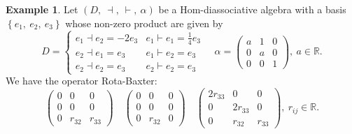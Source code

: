 \documentclass[11pt,twoside,reqno]{amsart}
\theoremstyle{plain}
\theoremstyle{definition}
\newtheorem{ex}[thm]{Example}
\begin{document}
\begin{ex}
Let $(D ,\ \dashv,\  \vdash,\  \alpha)$ be a Hom-diassociative algebra with a basis $\left\{e_1 ,\ e_2 ,\ e_3\right\}$ whose non-zero product are given by 
$$
D= \left\{
    \begin{array}{ll}
      e_1\dashv e_2=-2e_3&e_1\vdash e_1=\frac{1}{4}e_3\\
      e_2\dashv e_1=e_3&e_1\vdash e_2=e_3\\
			e_2\dashv e_2=e_3&e_2\vdash e_2=e_3 
    \end{array}
\right.\quad
\alpha = 
\begin{pmatrix}
a & 1 &0 \\
0 & a &0 \\
0 &0&1 
\end{pmatrix} ,\ a\in\mathbb{R}.
$$
We have the operator Rota-Baxter:
$$
\begin{pmatrix}
0 &0 &0 \\
0 & 0 &0 \\
0 & r_{32}& r_{33}
\end{pmatrix} \quad
\begin{pmatrix}
0 &0 &0 \\
0 & 0 &0 \\
0 & r_{32}&0
\end{pmatrix} \quad
\begin{pmatrix}
2r_{33} &0 &0 \\
0 & 2r_{33} &0 \\
0 & r_{32}& r_{33}
\end{pmatrix}  ,\ r_{ij}\in\mathbb{R}.
$$
\end{ex}
\end{document}
